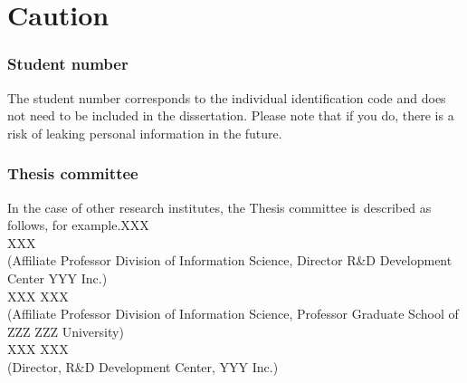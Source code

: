 \chapter{Caution}
\subsection{Student number}
The student number corresponds to the individual identification code and does not need to be included in the dissertation. Please note that if you do, there is a risk of leaking personal information in the future.

\subsection{Thesis committee}
In the case of other research institutes, the Thesis committee is described as follows, for example.XXX \\
XXX \\
(Affiliate Professor Division of Information Science, Director R&D Development Center YYY Inc.) \\
XXX XXX \\
(Affiliate Professor Division of Information Science, Professor Graduate School of ZZZ ZZZ University) \\
XXX XXX \\
(Director, R&D Development Center, YYY Inc.)
